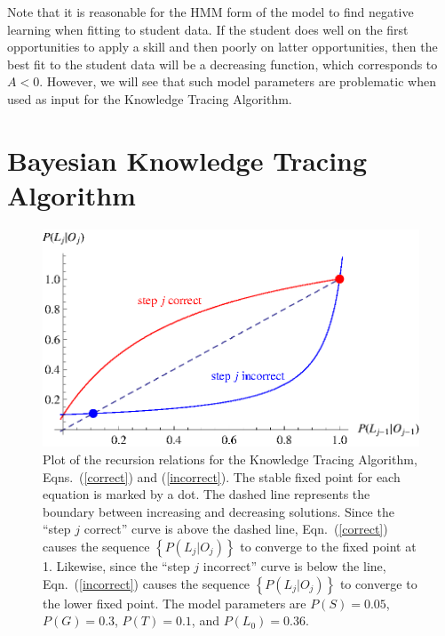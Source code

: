\documentclass{acmlarge-edm}
\begin{document}
Note that it is reasonable for the HMM form of the model to find
negative learning when fitting to student data.  If the student does
well on the first opportunities to apply a skill and then poorly on latter
opportunities, then the best fit to the student data will be a
decreasing function, which corresponds to $A<0$.  However,
we will see that such model parameters are problematic when
used as input for the Knowledge Tracing Algorithm.

\section{Bayesian Knowledge Tracing Algorithm}

\begin{figure}
\centering\includegraphics{p-recursion.eps}
\caption{
  Plot of the recursion relations for the Knowledge Tracing Algorithm, 
  Eqns.~(\ref{correct}) and (\ref{incorrect}).
  The stable fixed point for each equation is marked
  by a dot.  The dashed line represents the boundary between
  increasing and decreasing solutions.  Since the ``step $j$ correct'' curve is above the
  dashed line, Eqn.~(\ref{correct}) causes the sequence $\left\{P(L_j|O_j)\right\}$ to converge to
  the fixed point at 1.  Likewise, since the ``step $j$ incorrect''
  curve is below the line, Eqn.~(\ref{incorrect}) causes the sequence $\left\{P(L_j|O_j)\right\}$
  to converge to the lower fixed point.
  The model parameters are $P(S)=0.05$, $P(G)=0.3$,  $P(T)=0.1$, and $P(L_0)=0.36$.
 }
 \label{p-recursion}
\end{figure}
\end{document}
